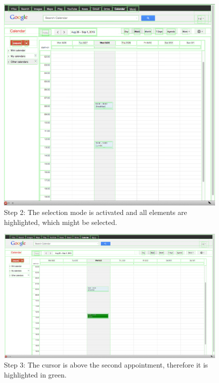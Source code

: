 \begin{figure}\centering
		\includegraphics[width=13cm]{images/gcal-screenshot-walkthrough/gcal-wt-2.png}
		\caption{Step 2: The selection mode is activated and all elements are highlighted, which might be selected.}
		\label{gcal-wt-2}
\end{figure} 

\begin{figure}\centering
		\includegraphics[width=13cm]{images/gcal-screenshot-walkthrough/gcal-wt-3.png}
		\caption{Step 3: The cursor is above the second appointment, therefore it is highlighted in green.}
		\label{gcal-wt-3}
\end{figure} 

